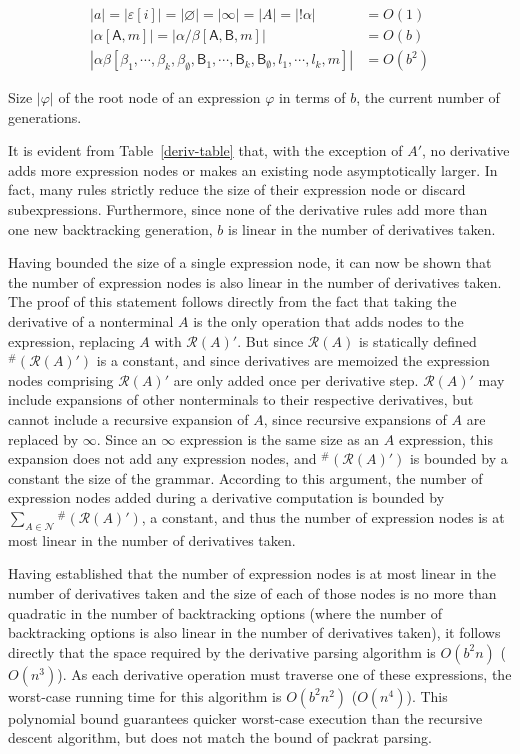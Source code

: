 \documentclass[submission,copyright,creativecommons]{eptcs}
\newcommand{\Rule}{\mathcal{R}}
\newcommand{\NonT}{\mathcal{N}}
\newcommand{\g}[1]{\mathsf{#1}}
\newcommand{\genseq}{\alpha\beta[\beta_1,\cdots,\beta_k,\beta_\emptyset,\g{B}_1,\cdots,\g{B}_k,\g{B}_\emptyset,l_1,\cdots,l_k,m]}
\begin{document}
\begin{table}[b]
\centering
\begin{align*}
|a| = |\varepsilon[i]| = |\varnothing| = |\infty| = |A| = |!\alpha| & = O(1) \\
                  |\alpha[\g{A},m]| = |\alpha/\beta[\g{A},\g{B},m]| & = O(b) \\
                                                          |\genseq| & = O(b^2)
\end{align*}
\caption[Expression size]{Size $|\varphi|$ of the root node of an expression $\varphi$ in terms of $b$, the current number of generations.}
\label{size-table}
\end{table}

It is evident from Table~\ref{deriv-table} that, with the exception of $A'$, no derivative adds more expression nodes or makes an existing node asymptotically larger.
In fact, many rules strictly reduce the size of their expression node or discard subexpressions. Furthermore, since none of the derivative rules add more than one new backtracking generation, $b$ is linear in the number of derivatives taken. 

Having bounded the size of a single expression node, it can now be shown that the number of expression nodes is also linear in the number of derivatives taken.
The proof of this statement follows directly from the fact that taking the derivative of a nonterminal $A$ is the only operation that adds nodes to the expression, replacing $A$ with $\Rule(A)'$. 
But since $\Rule(A)$ is statically defined $^\#(\Rule(A)')$ is a constant, and since derivatives are memoized the expression nodes comprising $\Rule(A)'$ are only added once per derivative step. 
$\Rule(A)'$ may include expansions of other nonterminals to their respective derivatives, but cannot include a recursive expansion of $A$, since recursive expansions of $A$ are replaced by $\infty$. 
Since an $\infty$ expression is the same size as an $A$ expression, this expansion does not add any expression nodes, and $^\#(\Rule(A)')$ is bounded by a constant the size of the grammar.
According to this argument, the number of expression nodes added during a derivative computation is bounded by $\sum_{A \in \NonT} {^\#}(\Rule(A)')$, a constant, and thus the number of expression nodes is at most linear in the number of derivatives taken.

Having established that the number of expression nodes is at most linear in the number of derivatives taken and the size of each of those nodes is no more than quadratic in the number of backtracking options (where the number of backtracking options is also linear in the number of derivatives taken), it follows directly that the space required by the derivative parsing algorithm is $O(b^2 n)$ ($O(n^3)$). 
As each derivative operation must traverse one of these expressions, the worst-case running time for this algorithm is $O(b^2 n^2)$ ($O(n^4)$). 
This polynomial bound guarantees quicker worst-case execution than the recursive descent algorithm, but does not match the bound of packrat parsing.
\end{document}
